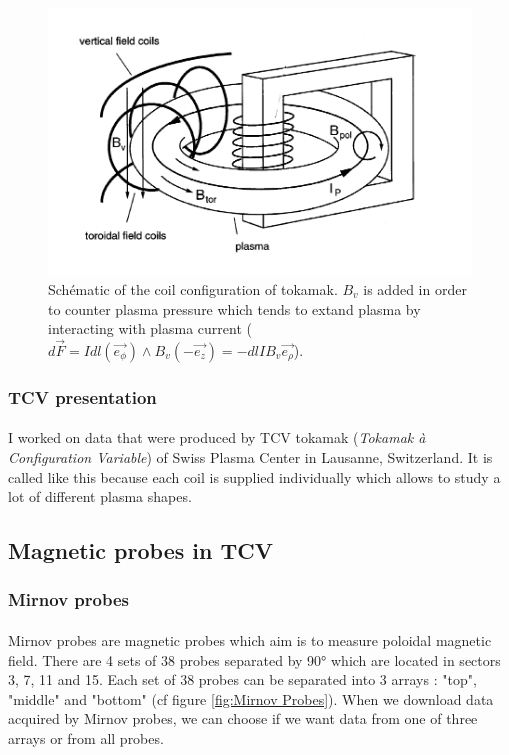 \documentclass[12pt]{article}
\begin{document}
\begin{figure}
    \centering
    \includegraphics[scale=0.5]{Figures/Schéma confinement magnétique.png}
    \caption{Schématic of the coil configuration of tokamak. \(B_v\) is added in order to counter plasma pressure which tends to extand plasma by interacting with plasma current (\(d\Vec{F}=Idl(\Vec{e_{\phi}})\wedge B_v(-\Vec{e_z})=-dl I B_v \Vec{e_\rho}\)). \cite{holger_reimerdes_mhd_2001}}
    \label{fig:magnetic confinement}
\end{figure}


\subsubsection{TCV presentation}

\paragraph{}
I worked on data that were produced by TCV tokamak (\textit{Tokamak à Configuration Variable}) of Swiss Plasma Center in Lausanne, Switzerland. It is called like this because each coil is supplied individually which allows to study a lot of different plasma shapes. 

\subsection{Magnetic probes in TCV}

\subsubsection{Mirnov probes}\label{Mirnov Probes}

\paragraph{}
Mirnov probes are magnetic probes which aim is to measure poloidal magnetic field. There are 4 sets of 38 probes separated by 90° which are located in sectors 3, 7, 11 and 15. Each set of 38 probes can be separated into 3 arrays : "top", "middle" and "bottom" (cf figure \ref{fig:Mirnov Probes}). When we download data acquired by Mirnov probes, we can choose if we want data from one of three arrays or from all probes. 
\end{document}
